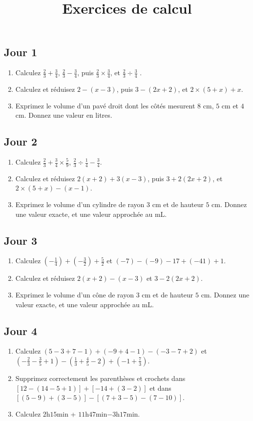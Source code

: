 \documentclass[14 pt, fleqn]{extarticle}
\title{Exercices de calcul}
\date{}
\theoremstyle{plain}
\begin{document}
	 
 \subsection*{Jour 1}
 
 \begin{enumerate}
 \item Calculez $\frac23+ \frac34$, $\frac23 - \frac34$, puis $\frac23\times\frac34$, et $\frac23\div \frac34$ .
 \item Calculez et réduisez $2 - (x-3)$, puis $3- (2x + 2)$, et $2\times (5+x)+ x$.
 \item Exprimez le volume d'un pavé droit dont les côtés mesurent $8$ cm, $5$ cm et $4$ cm. Donnez une valeur en litres. 
 \end{enumerate}
 \subsection*{Jour 2}
 
 \begin{enumerate}
 \item Calculez $\frac23+ \frac34\times \frac59$, $\frac23\div\frac14 - \frac34$.
 \item Calculez et réduisez $2(x+2) + 3(x-3)$, puis $3+ 2(2x + 2)$, et $2\times (5+x) - (x-1)$.
 \item Exprimez le volume d'un cylindre de rayon $3$ cm et de hauteur $5$ cm. Donnez une valeur exacte, et une valeur approchée au mL.
 \end{enumerate}
 
 \subsection*{Jour 3}
 
 \begin{enumerate}
 \item Calculez $(-\frac14) + (-\frac32) + \frac52$ et $(-7) - (-9) - 17 + (-41) + 1$.
 \item Calculez et réduisez $2(x+2) - (x-3)$ et $3- 2(2x + 2)$.
 \item Exprimez le volume d'un cône de rayon $3$ cm et de hauteur $5$ cm. Donnez une valeur exacte, et une valeur approchée au mL.
 \end{enumerate}
 \subsection*{Jour 4}
 
 \begin{enumerate}
 \item Calculez $(5-3+7-1) + (-9+4-1) - (-3-7+2)$ et $\left( -\frac23 - \frac35 + 1\right) - \left(\frac13+\frac45 - 2\right) + \left (-1+ \frac73\right)$.
 \item Supprimez correctement les parenthèses et crochets dans $[12-(14 - 5 + 1) ] + [-14 + (3-2)]$ et dans $[(5-9)+(3-5)] - [(7+3-5)-(7-10)]$. 
 \item Calculez $2$h$15$min + $11$h$47$min$-3$h$17$min.
 \end{enumerate}
 
\end{document}
